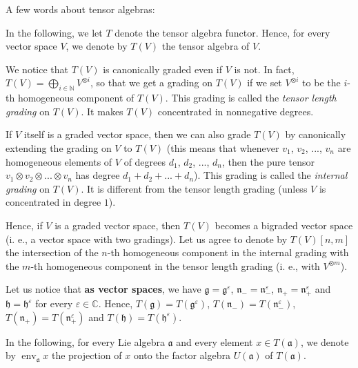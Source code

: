 \documentclass[etingof-lie.tex]{subfiles}
\begin{document}
A few words about tensor algebras:

\begin{Convention}
In the following, we let $T$ denote the tensor algebra functor. Hence, for
every vector space $V$, we denote by $T\left(  V\right)  $ the tensor algebra
of $V$.

We notice that $T\left(  V\right)  $ is canonically graded even if $V$ is not.
In fact, $T\left(  V\right)  =\bigoplus\limits_{i\in\mathbb{N}}V^{\otimes i}$,
so that we get a grading on $T\left(  V\right)  $ if we set $V^{\otimes i}$ to
be the $i$-th homogeneous component of $T\left(  V\right)  $. This grading is
called the \textit{tensor length grading} on $T\left(  V\right)  $. It makes
$T\left(  V\right)  $ concentrated in nonnegative degrees.

If $V$ itself is a graded vector space, then we can also grade $T\left(
V\right)  $ by canonically extending the grading on $V$ to $T\left(  V\right)
$ (this means that whenever $v_{1}$, $v_{2}$, $...$, $v_{n}$ are homogeneous
elements of $V$ of degrees $d_{1}$, $d_{2}$, $...$, $d_{n}$, then the pure
tensor $v_{1}\otimes v_{2}\otimes...\otimes v_{n}$ has degree $d_{1}%
+d_{2}+...+d_{n}$). This grading is called the \textit{internal grading} on
$T\left(  V\right)  $. It is different from the tensor length grading (unless
$V$ is concentrated in degree $1$).

Hence, if $V$ is a graded vector space, then $T\left(  V\right)  $ becomes a
bigraded vector space (i. e., a vector space with two gradings). Let us agree
to denote by $T\left(  V\right)  \left[  n,m\right]  $ the intersection of the
$n$-th homogeneous component in the internal grading with the $m$-th
homogeneous component in the tensor length grading (i. e., with $V^{\otimes
m}$).
\end{Convention}

Let us notice that \textbf{as vector spaces}, we have $\mathfrak{g}%
=\mathfrak{g}^{\varepsilon}$, $\mathfrak{n}_{-}=\mathfrak{n}_{-}^{\varepsilon
}$, $\mathfrak{n}_{+}=\mathfrak{n}_{+}^{\varepsilon}$ and $\mathfrak{h}%
=\mathfrak{h}^{\varepsilon}$ for every $\varepsilon\in\mathbb{C}$. Hence,
$T\left(  \mathfrak{g}\right)  =T\left(  \mathfrak{g}^{\varepsilon}\right)  $,
$T\left(  \mathfrak{n}_{-}\right)  =T\left(  \mathfrak{n}_{-}^{\varepsilon
}\right)  $, $T\left(  \mathfrak{n}_{+}\right)  =T\left(  \mathfrak{n}%
_{+}^{\varepsilon}\right)  $ and $T\left(  \mathfrak{h}\right)  =T\left(
\mathfrak{h}^{\varepsilon}\right)  $.

\begin{definition}
In the following, for every Lie algebra $\mathfrak{a}$ and every element $x\in
T\left(  \mathfrak{a}\right)  $, we denote by $\operatorname*{env}%
\nolimits_{\mathfrak{a}}x$ the projection of $x$ onto the factor algebra
$U\left(  \mathfrak{a}\right)  $ of $T\left(  \mathfrak{a}\right)  $.
\end{definition}
\end{document}
